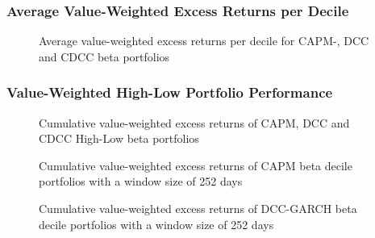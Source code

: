 \documentclass[11pt,a4paper]{article}
\begin{document}
\subsubsection{Average Value-Weighted Excess Returns per Decile}

\begin{figure}[H]
	\vspace{-10mm}
	\hspace{-5mm}\vspace{-15mm}
	\caption{Average value-weighted excess returns per decile for CAPM-, DCC and CDCC beta portfolios}
	\label{figure:vw_avg_ret_per_decile_appendix}
\end{figure}



\subsubsection{Value-Weighted High-Low Portfolio Performance}

\begin{figure}[H]
	\vspace{-12mm}
	\hspace{-5mm}\vspace{-15mm}
	\caption{Cumulative value-weighted excess returns of CAPM, DCC and CDCC High-Low beta portfolios}
	\label{figure:vw_cum_ret_high-low_appendix}
\end{figure}


\begin{figure}[H]
	\vspace{-12mm}
	\hspace{-5mm}\vspace{-15mm}
	\caption{Cumulative value-weighted excess returns of CAPM beta decile portfolios with a window size of 252 days}
	\label{figure:vw_cum_ret_deciles_CAPM_appendix}
\end{figure}

\begin{figure}[H]
	\vspace{-12mm}
	\hspace{-5mm}\vspace{-15mm}
	\caption{Cumulative value-weighted excess returns of DCC-GARCH beta decile portfolios with a window size of 252 days}
	\label{figure:vw_cum_ret_deciles_DCC_appendix}
\end{figure}
\end{document}
